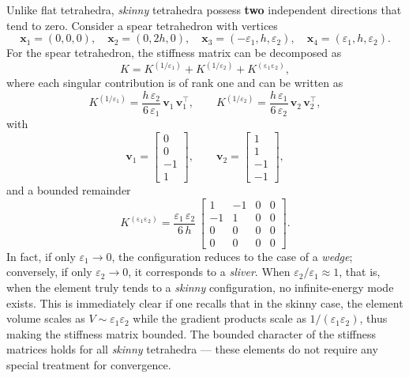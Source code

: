 \documentclass{article}
\begin{document}
Unlike flat tetrahedra, \emph{skinny} tetrahedra possess \textbf{two}
independent directions that tend to zero. Consider a spear tetrahedron with vertices
\[
\bm{x}_1=(0,0,0), \quad
\bm{x}_2=(0,2h,0), \quad
\bm{x}_3=(-\varepsilon_1,h,\varepsilon_2), \quad
\bm{x}_4=(\varepsilon_1,h,\varepsilon_2).
\]
For the spear tetrahedron, the stiffness matrix can be decomposed as
\[
K
= K^{(1/\varepsilon_1)} + K^{(1/\varepsilon_2)} + K^{(\mathrm{\varepsilon_1\varepsilon_2})},
\]
where each singular contribution is of rank one and can be written as
\[
K^{(1/\varepsilon_1)}
= \frac{h\,\varepsilon_2}{6\,\varepsilon_1}\,
\boldsymbol{v}_1\,\boldsymbol{v}_1^{\!\top},
\qquad
K^{(1/\varepsilon_2)}
= \frac{h\,\varepsilon_1}{6\,\varepsilon_2}\,
\boldsymbol{v}_2\,\boldsymbol{v}_2^{\!\top},
\]
with
\[
\boldsymbol{v}_1 =
\begin{bmatrix} 0 \\[2pt] 0 \\[2pt] -1 \\[2pt] 1 \end{bmatrix},
\qquad
\boldsymbol{v}_2 =
\begin{bmatrix} 1 \\[2pt] 1 \\[2pt] -1 \\[2pt] -1 \end{bmatrix},
\]
and a bounded remainder
\[
K^{(\mathrm{\varepsilon_1\varepsilon_2})}
= \frac{\varepsilon_1\,\varepsilon_2}{6\,h}\,
\begin{bmatrix}
1 & -1 & 0 & 0\\[3pt]
-1 & 1 & 0 & 0\\[3pt]
0 & 0 & 0 & 0\\[3pt]
0 & 0 & 0 & 0
\end{bmatrix}.
\]
In fact, if only \(\varepsilon_1 \to 0\), the configuration reduces to the case of a \emph{wedge};
conversely, if only \(\varepsilon_2 \to 0\), it corresponds to a \emph{sliver}.
When \(\varepsilon_2 / \varepsilon_1 \approx 1\),
that is, when the element truly tends to a \emph{skinny} configuration,
no infinite-energy mode exists.
This is immediately clear if one recalls that in the skinny case,
the element volume scales as \(V \sim \varepsilon_1 \varepsilon_2\)
while the gradient products scale as \(1/(\varepsilon_1 \varepsilon_2)\),
thus making the stiffness matrix bounded. The bounded character of the stiffness matrices holds for all
\emph{skinny} tetrahedra — these elements do not require any special
treatment for convergence.
\end{document}

